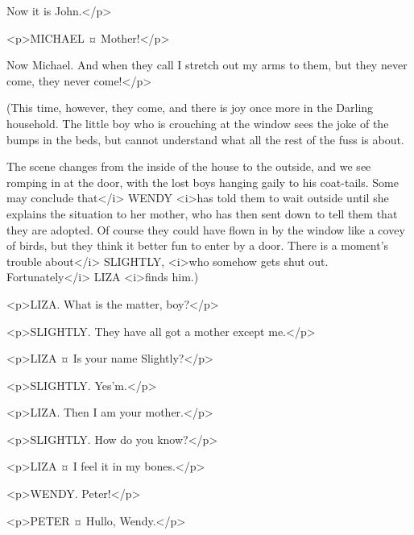 \begin{drama}
\mrsdarlingspeaks
Now it is John.</p>

<p>MICHAEL ¤
Mother!</p>

\mrsdarlingspeaks
Now Michael. And when they call I stretch out my arms to them, but they never come, they never come!</p>

\begin{stagedir}
(This time, however, they come, and there is joy once more in the Darling household. The little boy who is crouching at the window sees the joke of the bumps in the beds, but cannot understand what all the rest of the fuss is about.

The scene changes from the inside of the house to the outside, and we see \mrdarling romping in at the door, with the lost boys hanging gaily to his coat-tails. Some may conclude that</i> WENDY <i>has told them to wait outside until she explains the situation to her mother, who has then sent \mrdarling down to tell them that they are adopted. Of course they could have flown in by the window like a covey of birds, but they think it better fun to enter by a door. There is a moment's trouble about</i> SLIGHTLY, <i>who somehow gets shut out. Fortunately</i> LIZA <i>finds him.)
\end{stagedir}

<p>LIZA. What is the matter, boy?</p>

<p>SLIGHTLY. They have all got a mother except me.</p>

<p>LIZA ¤
Is your name Slightly?</p>

<p>SLIGHTLY. Yes'm.</p>

<p>LIZA. Then I am your mother.</p>

<p>SLIGHTLY. How do you know?</p>

<p>LIZA ¤
I feel it in my bones.</p>


<p>WENDY. Peter!</p>

<p>PETER ¤
Hullo, Wendy.</p>


\end{drama}
